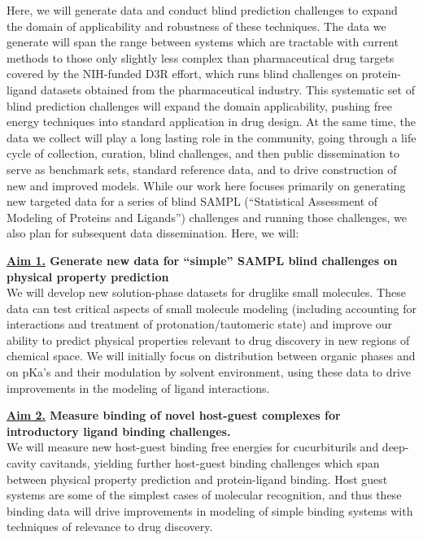 \documentclass[11pt]{article}
\begin{document}
Here, we will generate data and conduct blind prediction challenges to expand the domain of applicability and robustness of these techniques. 
The data we generate will span the range between systems which are tractable with current methods to those only slightly less complex than pharmaceutical drug targets covered by the NIH-funded D3R effort, which runs blind challenges on protein-ligand datasets obtained from the pharmaceutical industry.
This systematic set of blind prediction challenges will expand the domain applicability, pushing free energy techniques into standard application in drug design.
At the same time, the data we collect will play a long lasting role in the community, going through a life cycle of collection, curation, blind challenges, and then public dissemination to serve as benchmark sets,
standard reference data, and to drive construction of new and improved models. 
While our work here focuses primarily on generating new targeted data for a series of blind SAMPL (``Statistical Assessment of Modeling of Proteins and Ligands'') challenges and running those challenges, we also plan for subsequent data dissemination. Here, we will: 


{\bf \underline{Aim 1.} Generate new data for ``simple'' SAMPL blind challenges on physical property prediction}\\
We will develop new solution-phase datasets for druglike small molecules. 
These data can test critical aspects of small molecule modeling (including accounting for interactions and treatment of protonation/tautomeric state) and improve our ability to predict physical properties relevant to drug discovery in new regions of chemical space. 
We will initially focus on distribution between organic phases and on pKa's and their modulation by solvent environment, using these data to drive improvements in the modeling of ligand interactions.


{\bf \underline{Aim 2.} Measure binding of novel host-guest complexes for introductory ligand binding challenges.}\\
We will measure new host-guest binding free energies for cucurbiturils and deep-cavity cavitands, yielding further host-guest binding challenges which span between physical property prediction and protein-ligand binding. 
Host guest systems are some of the simplest cases of molecular recognition, and thus these binding data will drive improvements in modeling of simple binding systems with techniques of relevance to drug discovery.
\end{document}
